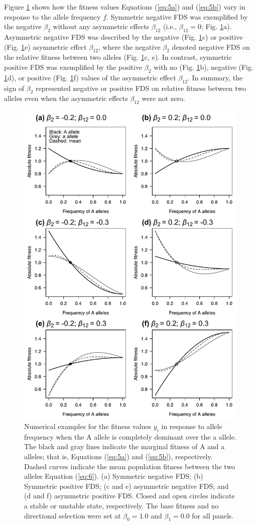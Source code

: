 \documentclass[12pt,]{article}
\begin{document}
Figure \ref{fig2:asym} shows how the fitness values Equations (\ref{eq:5a}) and (\ref{eq:5b}) vary in response to the allele frequency $f$. Symmetric negative FDS was exemplified by the negative $\beta_2$ without any asymmetric effects $\beta_{12}$ (i.e., $\beta_{12}=0$; Fig. \ref{fig2:asym}a). Asymmetric negative FDS was described by the negative (Fig. \ref{fig2:asym}c) or positive (Fig. \ref{fig2:asym}e) asymmetric effect $\beta_{12}$, where the negative $\beta_2$ denoted negative FDS on the relative fitness between two alleles (Fig. \ref{fig2:asym}c, e). In contrast, symmetric positive FDS was exemplified by the positive $\beta_2$ with no (Fig. \ref{fig2:asym}b), negative (Fig. \ref{fig2:asym}d), or positive (Fig. \ref{fig2:asym}f) values of the asymmetric effect $\beta_{12}$. In summary, the sign of $\beta_2$ represented negative or positive FDS on relative fitness between two alleles even when the asymmetric effects $\beta_{12}$ were not zero.

\begin{figure}[]
  \includegraphics[width=0.75\linewidth]{AsymFDSdomi.pdf}
  \caption{Numerical examples for the fitness values $y_i$ in response to allele frequency when the A allele is completely dominant over the a allele. The black and gray lines indicate the marginal fitness of A and a alleles; that is, Equations (\ref{eq:5a}) and (\ref{eq:5b}), respectively. Dashed curves indicate the mean population fitness between the two alleles Equation (\ref{eq:6}). (a) Symmetric negative FDS; (b) Symmetric positive FDS; (c and e) asymmetric negative FDS; and (d and f) asymmetric positive FDS. Closed and open circles indicate a stable or unstable state, respectively. The base fitness and no directional selection were set at $\beta_0=1.0$ and $\beta_1=0.0$ for all panels.}
  \label{fig2:asym}
\end{figure}
\end{document}
